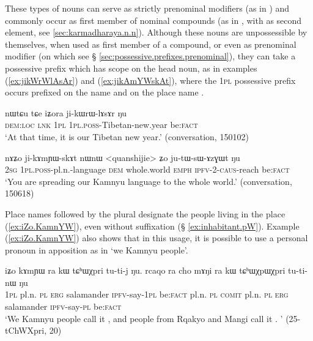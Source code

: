 These types of nouns can serve as strictly prenominal modifiers (as in ) and commonly occur as first member of nominal compounds (as in , with  as second element, see \ref{sec:karmadharaya.n.n}). Although these nouns are  unpossessible by themselves, when used as first member of a compound, or even as prenominal modifier (on which see § \ref{sec:possessive.prefixes.prenominal}), they can take a possessive prefix which has scope on the head noun, as in examples (\ref{ex:jikWrWlAsAr}) and (\ref{ex:jikAmYWskAt}), where the \textsc{1pl} possessive prefix  occurs prefixed on the name  and on the place name  .

\begin{exe}
\ex \label{ex:jikWrWlAsAr}
 \gll nɯtɕu tɕe iʑora ji-kɯrɯ-lɤsɤr ŋu \\
 \textsc{dem}:\textsc{loc} \textsc{lnk} \textsc{1pl} \textsc{1pl}.\textsc{poss}-Tibetan-new.year be:\textsc{fact} \\
 \glt `At that time, it is our Tibetan new year.' (conversation, 150102)
\end{exe}

\begin{exe}
\ex \label{ex:jikAmYWskAt}
 \gll nɤʑo ji-kɤmɲɯ-skɤt nɯnɯ <quanshijie> ʑo ju-tɯ-sɯ-ɤzɣɯt ŋu \\
 \textsc{2sg} \textsc{1pl}.\textsc{poss}-pl.n.-language \textsc{dem} whole.world \textsc{emph} \textsc{ipfv}-2-\textsc{caus}-reach be:\textsc{fact} \\
  \glt `You are spreading our Kamnyu language to the whole world.' (conversation, 150618)
\end{exe}

Place names followed by the plural  designate the people living in the place (\ref{ex:iZo.KamnYW}), even without  suffixation (§ \ref{ex:inhabitant.pW}). Example (\ref{ex:iZo.KamnYW}) also shows that in this usage, it is possible to use a personal pronoun in apposition as in   `we Kamnyu people'.

\begin{exe}
\ex \label{ex:iZo.KamnYW}
 \gll iʑo kɤmɲɯ ra kɯ tɕʰɯχpri tu-ti-j ŋu. rcaqo ra cho mɤŋi ra kɯ tɕʰɯχpɯχpri tu-ti-nɯ ŋu \\
 \textsc{1pl} pl.n. \textsc{pl} \textsc{erg} salamander \textsc{ipfv}-say-\textsc{1pl} be:\textsc{fact} pl.n. \textsc{pl} \textsc{comit} pl.n. \textsc{pl} \textsc{erg}  salamander \textsc{ipfv}-say-\textsc{pl} be:\textsc{fact} \\
 \glt `We Kamnyu people call it , and people from Rqakyo and Mangi call it . ' (25-tChWXpri, 20)
\end{exe}

